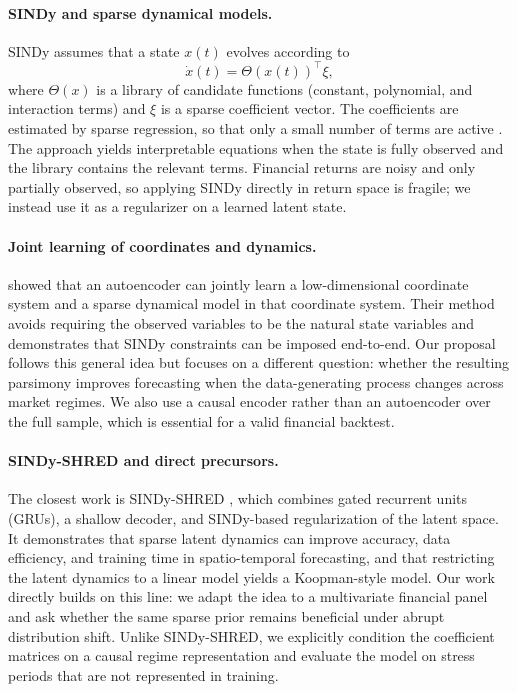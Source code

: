 \documentclass{article}
\begin{document}
\paragraph{SINDy and sparse dynamical models.}
SINDy assumes that a state $x(t)$ evolves according to
\begin{equation}
  \dot{x}(t) = \Theta(x(t))^\top \xi,
\end{equation}
where $\Theta(x)$ is a library of candidate functions (constant, polynomial, and interaction terms) and $\xi$ is a sparse coefficient vector. The coefficients are estimated by sparse regression, so that only a small number of terms are active \citep{brunton2016}. The approach yields interpretable equations when the state is fully observed and the library contains the relevant terms. Financial returns are noisy and only partially observed, so applying SINDy directly in return space is fragile; we instead use it as a regularizer on a learned latent state.

\paragraph{Joint learning of coordinates and dynamics.}
\citet{champion2019} showed that an autoencoder can jointly learn a low-dimensional coordinate system and a sparse dynamical model in that coordinate system. Their method avoids requiring the observed variables to be the natural state variables and demonstrates that SINDy constraints can be imposed end-to-end. Our proposal follows this general idea but focuses on a different question: whether the resulting parsimony improves forecasting when the data-generating process changes across market regimes. We also use a causal encoder rather than an autoencoder over the full sample, which is essential for a valid financial backtest.

\paragraph{SINDy-SHRED and direct precursors.}
The closest work is SINDy-SHRED \citep{gao2026sindyshred}, which combines gated recurrent units (GRUs), a shallow decoder, and SINDy-based regularization of the latent space. It demonstrates that sparse latent dynamics can improve accuracy, data efficiency, and training time in spatio-temporal forecasting, and that restricting the latent dynamics to a linear model yields a Koopman-style model. Our work directly builds on this line: we adapt the idea to a multivariate financial panel and ask whether the same sparse prior remains beneficial under abrupt distribution shift. Unlike SINDy-SHRED, we explicitly condition the coefficient matrices on a causal regime representation and evaluate the model on stress periods that are not represented in training.
\end{document}
